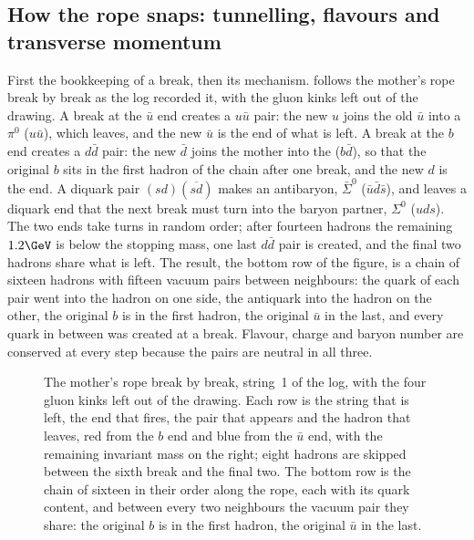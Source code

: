 \subsection{How the rope snaps: tunnelling, flavours and transverse momentum}
\label{sec:children_getting_married:breakup}

First the bookkeeping of a break, then its mechanism.
 follows the mother's
rope break by break as the  log recorded it, with the gluon kinks
left out of the drawing. A break at the $\bar u$ end creates a $u\bar u$
pair: the new $u$ joins the old $\bar u$ into a $\pi^0$ ($u\bar u$), which
leaves, and the new $\bar u$ is the end of what is left. A break at the
$b$ end creates a $d\bar d$ pair: the new $\bar d$ joins the mother into
the \Bstarbar ($b\bar d$), so that the original $b$ sits in the first
hadron of the chain after one break, and the new $d$ is the end. A diquark
pair $(sd)(\overline{sd})$ makes an antibaryon, $\bar\Sigma^0$
($\bar u\bar d\bar s$), and leaves a diquark end that the next break must
turn into the baryon partner, $\Sigma^0$ ($uds$). The two ends take turns
in random order; after fourteen hadrons the remaining $1.2\GeV$ is below
the stopping mass, one last $d\bar d$ pair is created, and the final two
hadrons share what is left. The result, the bottom row of the figure, is a
chain of sixteen hadrons with fifteen vacuum pairs between neighbours: the
quark of each pair went into the hadron on one side, the antiquark into
the hadron on the other, the original $b$ is in the first hadron, the
original $\bar u$ in the last, and every quark in between was created at a
break. Flavour, charge and baryon number are conserved at every step
because the pairs are neutral in all three.

\begin{figure}[htbp]\centering
\resizebox{\textwidth}{!}{}
\caption[The mother's rope break by break]{The mother's rope break by
break, string~1 of the  log, with the four gluon kinks left out
of the drawing. Each row is the string that is left, the end that fires,
the pair that appears and the hadron that leaves, red from the $b$ end and
blue from the $\bar u$ end, with the remaining invariant mass on the
right; eight hadrons are skipped between the sixth break and the final
two. The bottom row is the chain of sixteen in their order along the rope,
each with its quark content, and between every two neighbours the vacuum
pair they share: the original $b$ is in the first hadron, the original
$\bar u$ in the last.}
\label{fig:children_getting_married:chain_sketch}
\end{figure}


